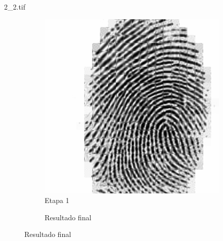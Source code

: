 \documentclass{beamer}
\begin{document}
\begin{frame}{2\_2.tif}
\begin{figure}
\begin{subfigure}[!ht]{0.32\textwidth}
                \includegraphics[width=\columnwidth]{Fingerprints/2_2_intermediate.jpg}
                \caption{Etapa 1}
            \end{subfigure}
            \begin{subfigure}[!ht]{0.32\textwidth}
                \caption{Resultado final}
            \end{subfigure}
        \end{figure}
    \end{frame}
\end{document}
